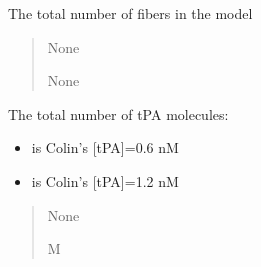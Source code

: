 \documentclass[letterpaper,10pt,english]{sphinxmanual}
\begin{document}
\begin{fulllineitems}
\begin{fulllineitems}
\label{\detokenize{lysis.util:lysis.util.parameters.MacroParameters.total_fibers}}
\pysigstartsignatures
{}
\pysigstopsignatures
\sphinxAtStartPar
The total number of fibers in the model
\begin{quote}\begin{description}
\sphinxAtStartPar
None

\sphinxAtStartPar
None

\end{description}\end{quote}

\end{fulllineitems}


\begin{fulllineitems}
\label{\detokenize{lysis.util:lysis.util.parameters.MacroParameters.total_molecules}}
\pysigstartsignatures
{}
\pysigstopsignatures
\sphinxAtStartPar
The total number of tPA molecules:
\begin{itemize}
\item {} 
 is Colin’s {[}tPA{]}=0.6 nM

\item {} 
 is Colin’s {[}tPA{]}=1.2 nM

\end{itemize}
\begin{quote}\begin{description}
\sphinxAtStartPar
None

\sphinxAtStartPar
M

\end{description}\end{quote}

\end{fulllineitems}



\end{fulllineitems}
\end{document}
